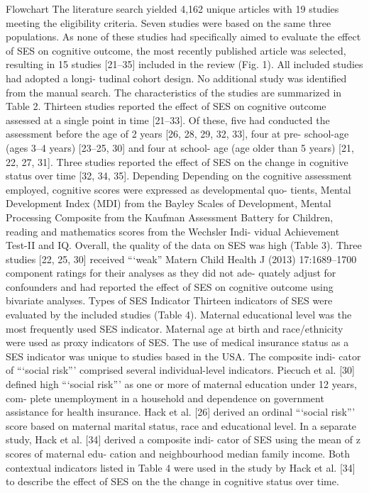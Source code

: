 \documentclass[english,man]{apa6}
\theoremstyle{definition}
\theoremstyle{definition}
\theoremstyle{definition}
\theoremstyle{remark}
\begin{document}
Flowchart The literature search yielded 4,162 unique articles with 19
studies meeting the eligibility criteria. Seven studies were based on
the same three populations. As none of these studies had specifically
aimed to evaluate the effect of SES on cognitive outcome, the most
recently published article was selected, resulting in 15 studies
{[}21--35{]} included in the review (Fig. 1). All included studies had
adopted a longi- tudinal cohort design. No additional study was
identified from the manual search. The characteristics of the studies
are summarized in Table 2. Thirteen studies reported the effect of SES
on cognitive outcome assessed at a single point in time {[}21--33{]}. Of
these, five had conducted the assessment before the age of 2 years
{[}26, 28, 29, 32, 33{]}, four at pre- school-age (ages 3--4 years)
{[}23--25, 30{]} and four at school- age (age older than 5 years) {[}21,
22, 27, 31{]}. Three studies reported the effect of SES on the change in
cognitive status over time {[}32, 34, 35{]}. Depending Depending on the
cognitive assessment employed, cognitive scores were expressed as
developmental quo- tients, Mental Development Index (MDI) from the
Bayley Scales of Development, Mental Processing Composite from the
Kaufman Assessment Battery for Children, reading and mathematics scores
from the Wechsler Indi- vidual Achievement Test-II and IQ. Overall, the
quality of the data on SES was high (Table 3). Three studies {[}22, 25,
30{]} received \enquote{`weak} Matern Child Health J (2013)
17:1689--1700 component ratings for their analyses as they did not ade-
quately adjust for confounders and had reported the effect of SES on
cognitive outcome using bivariate analyses. Types of SES Indicator
Thirteen indicators of SES were evaluated by the included studies (Table
4). Maternal educational level was the most frequently used SES
indicator. Maternal age at birth and race/ethnicity were used as proxy
indicators of SES. The use of medical insurance status as a SES
indicator was unique to studies based in the USA. The composite indi-
cator of \enquote{`social risk}' comprised several individual-level
indicators. Piecuch et al. {[}30{]} defined high \enquote{`social risk}'
as one or more of maternal education under 12 years, com- plete
unemployment in a household and dependence on government assistance for
health insurance. Hack et al. {[}26{]} derived an ordinal
\enquote{`social risk}' score based on maternal marital status, race and
educational level. In a separate study, Hack et al. {[}34{]} derived a
composite indi- cator of SES using the mean of z scores of maternal edu-
cation and neighbourhood median family income. Both contextual
indicators listed in Table 4 were used in the study by Hack et al.
{[}34{]} to describe the effect of SES on the the change in cognitive
status over time.
\end{document}
